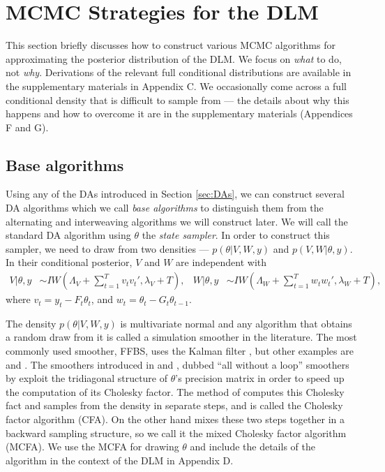 \documentclass[12pt]{article}
\begin{document}
\section{MCMC Strategies for the DLM}\label{sec:Algs}

This section briefly discusses how to construct various MCMC algorithms for approximating the posterior distribution of the DLM. We focus on {\it what} to do, not {\it why}. Derivations of the relevant full conditional distributions are available in the supplementary materials in Appendix C. We occasionally come across a full conditional density that is difficult to sample from --- the details about why this happens and how to overcome it are in the supplementary materials (Appendices F and G).

\subsection{Base algorithms}\label{sec:Algs:base}
Using any of the DAs introduced in Section \ref{sec:DAs}, we can construct several DA algorithms which we call {\it base algorithms} to distinguish them from the alternating and interweaving algorithms we will construct later. We will call the standard DA algorithm \citep{fruhwirth1994data,carter1994gibbs} using $\theta$ the {\it state sampler}. In order to construct this sampler, we need to draw from two densities --- $p(\theta|V,W,y)$ and $p(V,W|\theta,y)$. In their conditional posterior, $V$ and $W$ are independent with
\begin{align*}
  V|\theta,y &\sim IW\left(\Lambda_V + \sum_{t=1}^Tv_tv_t',\lambda_V + T\right), &
  W|\theta,y &\sim IW\left(\Lambda_W + \sum_{t=1}^Tw_tw_t',\lambda_{W} + T\right), %
\end{align*}
where $v_t = y_t - F_t\theta_t$, and $w_t = \theta_t - G_t\theta_{t-1}$. 

The density $p(\theta|V,W,y)$ is multivariate normal and any algorithm that obtains a random draw from it is called a simulation smoother in the literature. The most commonly used smoother, FFBS, uses the Kalman filter \citep{fruhwirth1994data,carter1994gibbs}, but other examples are \citet{koopman1993disturbance} and \citet{de1995simulation}. The smoothers introduced in \citet{mccausland2011simulation} and \citet{rue2001fast}, dubbed ``all without a loop'' smoothers by \citet{kastner2013ancillarity} exploit the tridiagonal structure of $\theta$'s precision matrix in order to speed up the computation of its Cholesky factor. The method of \citet{rue2001fast} computes this Cholesky fact and samples from the density in separate steps, and is called the Cholesky factor algorithm (CFA). On the other hand \citet{mccausland2011simulation} mixes these two steps together in a backward sampling structure, so we call it the mixed Cholesky factor algorithm (MCFA). We use the MCFA for drawing $\theta$ and include the details of the algorithm in the context of the DLM in Appendix D.
\end{document}
